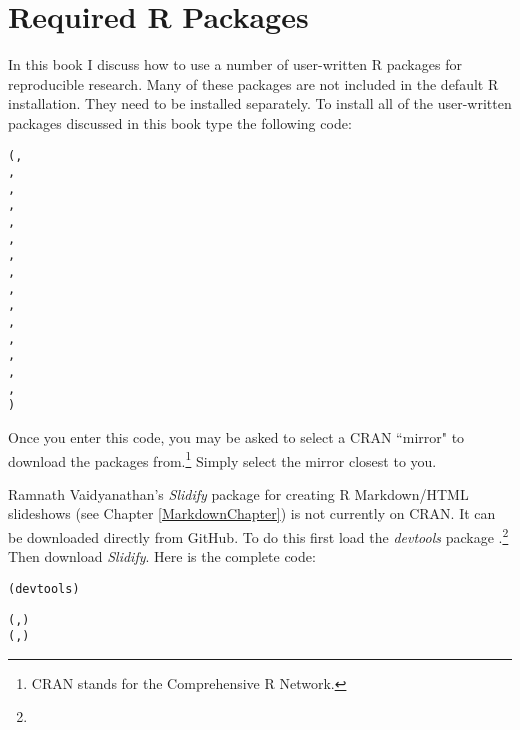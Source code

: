 


\chapter*{Required R Packages} \label{ReqPackages}

In this book I discuss how to use a number of user-written R packages for reproducible research. Many of these packages are not included in the default R installation. They need to be installed separately. To install all of the user-written packages discussed in this book type the following code:

\begin{knitrout}
\color{fgcolor}\begin{kframe}
\begin{alltt}
(,
                , 
                , 
                ,
                , 
                ,
                , 
                , 
                , 
                , 
                ,
                ,
                ,
                ,                     
                , 
                )
\end{alltt}
\end{kframe}
\end{knitrout}


\noindent Once you enter this code, you may be asked to select a CRAN ``mirror" to download the packages from.\footnote{CRAN stands for the Comprehensive R Network.} Simply select the mirror closest to you.

 Ramnath Vaidyanathan's \emph{Slidify} package \citeyearpar{R-slidify} for creating R Markdown/HTML slideshows (see Chapter \ref{MarkdownChapter}) is not currently on CRAN. It can be downloaded directly from GitHub. To do this first load the \emph{devtools} package \cite[]{R-devtools}.\footnote{} Then download \emph{Slidify}. Here is the complete code:

\begin{knitrout}
\color{fgcolor}\begin{kframe}
\begin{alltt}
(devtools)

(, )
(, )
\end{alltt}
\end{kframe}
\end{knitrout}


